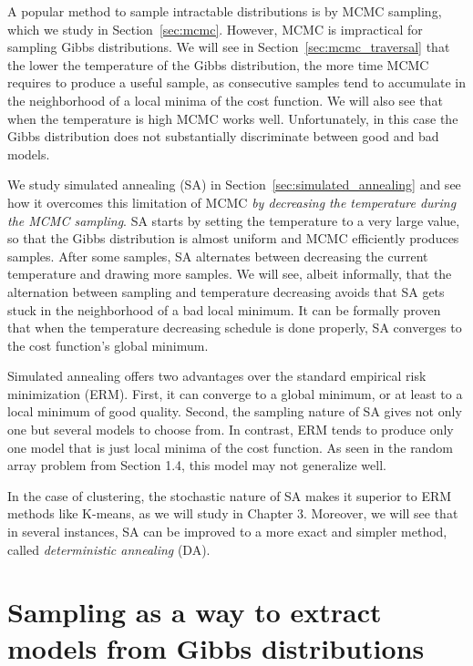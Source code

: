 A popular method to sample intractable distributions is by MCMC
sampling, which we study in Section~\ref{sec:mcmc}. However, MCMC is impractical
for sampling Gibbs distributions. We will see in Section~\ref{sec:mcmc_traversal} that the lower
the temperature of the Gibbs distribution, the more time MCMC requires
to produce a useful sample, as consecutive samples tend to accumulate in
the neighborhood of a local minima of the cost function. We will also see
that when the temperature is high MCMC works well. Unfortunately, in
this case the Gibbs distribution does not substantially discriminate between
good and bad models.

We study simulated annealing (SA) in Section~\ref{sec:simulated_annealing} and see how it overcomes
this limitation of MCMC \emph{by decreasing the temperature during the
MCMC sampling}. SA starts by setting the temperature to a very large
value, so that the Gibbs distribution is almost uniform and MCMC efficiently produces samples. After some samples, SA alternates between decreasing
the current temperature and drawing more samples. We will see,
albeit informally, that the alternation between sampling and temperature
decreasing avoids that SA gets stuck in the neighborhood of a bad local
minimum. It can be formally proven that when the temperature decreasing
schedule is done properly, SA converges to the cost function's global
minimum.

Simulated annealing offers two advantages over the standard empirical
risk minimization (ERM). First, it can converge to a global minimum, or
at least to a local minimum of good quality. Second, the sampling nature
of SA gives not only one but several models to choose from. In contrast,
ERM tends to produce only one model that is just local minima of the
cost function. As seen in the random array problem from Section 1.4, this
model may not generalize well.

In the case of clustering, the stochastic nature of SA makes it superior
to ERM methods like K-means, as we will study in Chapter 3. Moreover,
we will see that in several instances, SA can be improved to a more exact
and simpler method, called \emph{deterministic annealing} (DA).

\section{Sampling as a way to extract models from Gibbs distributions}
\label{sec:sampling}

